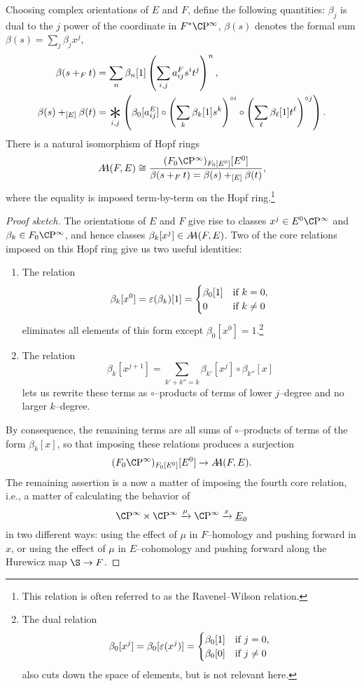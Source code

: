 \begin{lemma}\label{UnstableRWRelation}
Choosing complex orientations of \(E\) and \(F\), define the following quantities: \(\beta_j\) is dual to the \(j\){\th} power of the coordinate in \(F^* \CP^\infty\), \(\beta(s)\) denotes the formal sum \(\beta(s) = \sum_j \beta_j x^j\),
\begin{align*}
\beta(s +_F t) & = \sum_n \beta_n[1] \left(\sum_{i, j} a_{ij}^F s^i t^j \right)^n, \\
\beta(s) +_{[E]} \beta(t) & = \bigast_{i, j} \left(\beta_0[a_{ij}^E] \circ \left( \sum_k \beta_k[1] s^k \right)^{\circ i} \circ \left( \sum_\ell \beta_\ell[1] t^\ell \right)^{\circ j} \right).
\end{align*}
There is a natural isomorphism of Hopf rings \[\AA(F, E) \cong \frac{(F_0 \CP^\infty)_{F_0[E^0]}[E^0]}{\beta(s +_F t) = \beta(s) +_{[E]} \beta(t)},\] where the equality is imposed term-by-term on the Hopf ring.\footnote{This relation is often referred to as the Ravenel--Wilson relation.}
\end{lemma}
\begin{proof}[Proof sketch]
The orientations of \(E\) and \(F\) give rise to classes \(x^j \in E^0 \CP^\infty\) and \(\beta_k \in F_0 \CP^\infty\), and hence classes \(\beta_k[x^j] \in \AA(F, E)\).  Two of the core relations imposed on this Hopf ring give us two useful identities:
\begin{enumerate}
    \item The relation \[\beta_k[x^0] = \eps(\beta_k)[1] = \begin{cases} \beta_0[1] & \text{if \(k = 0\)}, \\ 0 & \text{if \(k \ne 0\)}\end{cases}\] eliminates all elements of this form except \(\beta_0[x^0] = 1\).\footnote{The dual relation \[\beta_0[x^j] = \beta_0[\eps(x^j)] = \begin{cases} \beta_0[1] & \text{if \(j = 0\)}, \\ \beta_0[0] & \text{if \(j \ne 0\)}\end{cases}\] also cuts down the space of elements, but is not relevant here.}
    \item The relation \[\beta_k[x^{j+1}] = \sum_{k' + k'' = k} \beta_{k'}[x^j] \circ \beta_{k''}[x]\] lets us rewrite these terms as \(\circ\)--products of terms of lower \(j\)--degree and no larger \(k\)--degree.
\end{enumerate}
By consequence, the remaining terms are all sums of \(\circ\)--products of terms of the form \(\beta_k[x]\), so that imposing these relations produces a surjection \[(F_0 \CP^\infty)_{F_0[E^0]}[E^0] \to \AA(F, E).\]  The remaining assertion is a now a matter of imposing the fourth core relation, i.e., a matter of calculating the behavior of \[\CP^\infty \times \CP^\infty \xrightarrow{\mu} \CP^\infty \xrightarrow{x} \OS{E}{0}\] in two different ways: using the effect of \(\mu\) in \(F\)--homology and pushing forward in \(x\), or using the effect of \(\mu\) in \(E\)--cohomology and pushing forward along the Hurewicz map \(\S \to F\).
\end{proof}



